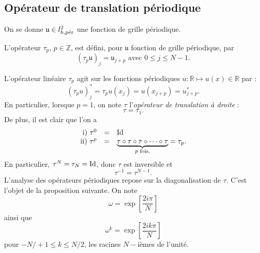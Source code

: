 \subsection{Opérateur de translation périodique}
On se donne $\mathfrak{u} \in l^2_{h,\per}$ une fonction de grille périodique.
\begin{definition}
L'opérateur $\tau_p$, $p \in \mathbb{Z}$, est défini, pour $\mathfrak{u}$ fonction de grille périodique, par
\begin{equation}
(\tau_p \mathfrak{u})_j = \mathfrak{u}_{j+p} \text{ avec } 0 \leq j \leq N-1.
\end{equation}
\end{definition}
L'opérateur linéaire $\tau_p$ agit sur les fonctions périodiques $u : \mathbb{R} \mapsto u(x) \in \mathbb{R}$ par :
\begin{equation}
(\tau_p u)^*_j = \tau_p u(x_j) = u(x_{j+p}) = u^*_{j+p}.
\end{equation}
En particulier, lorsque $p=1$, on note $\tau$ l'\textit{opérateur de translation à droite} :
\begin{equation}
\tau = \tau_{1}.
\end{equation}
De plus, il est clair que l'on a
\begin{equation}
\begin{array}{rcl}
\text{i)   }\tau^0 & = & \Id\\
\text{ii)  }\tau^p & = & \underbrace{\tau \circ \tau \circ \tau \circ \cdots \circ \tau}_{p \text{ fois.}} = \tau_p.
\end{array}
\end{equation}
En particulier, $\tau^N = \tau_N = \Id$, donc $\tau$ est inversible et
\begin{equation}
\tau^{-1} = \tau^{N-1}.
\end{equation}
L'analyse des opérateurs périodiques repose sur la diagonalisation de $\tau$. C'est l'objet de la proposition suivante. On note
\begin{equation}
\omega = \exp \left[ \dfrac{2 i \pi}{N} \right]
\end{equation}
ainsi que
\begin{equation}
\omega^k = \exp \left[ \dfrac{2 i k \pi}{N} \right]
\end{equation}
pour $-N/+1 \leq k \leq N/2$, les racines $N-$ièmes de l'unité.
